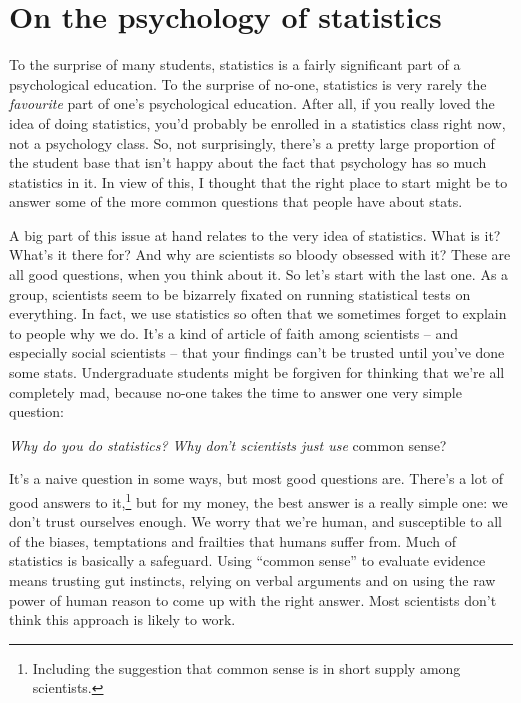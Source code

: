\documentclass[
  a4paper,
]{book}
\begin{document}
\hypertarget{on-the-psychology-of-statistics}{%
\section{On the psychology of
statistics}\label{on-the-psychology-of-statistics}}

To the surprise of many students, statistics is a fairly significant
part of a psychological education. To the surprise of no-one, statistics
is very rarely the \emph{favourite} part of one's psychological
education. After all, if you really loved the idea of doing statistics,
you'd probably be enrolled in a statistics class right now, not a
psychology class. So, not surprisingly, there's a pretty large
proportion of the student base that isn't happy about the fact that
psychology has so much statistics in it. In view of this, I thought that
the right place to start might be to answer some of the more common
questions that people have about stats.

A big part of this issue at hand relates to the very idea of statistics.
What is it? What's it there for? And why are scientists so bloody
obsessed with it? These are all good questions, when you think about it.
So let's start with the last one. As a group, scientists seem to be
bizarrely fixated on running statistical tests on everything. In fact,
we use statistics so often that we sometimes forget to explain to people
why we do. It's a kind of article of faith among scientists -- and
especially social scientists -- that your findings can't be trusted
until you've done some stats. Undergraduate students might be forgiven
for thinking that we're all completely mad, because no-one takes the
time to answer one very simple question:

\emph{Why do you do statistics? Why don't scientists just use} common
sense?

It's a naive question in some ways, but most good questions are. There's
a lot of good answers to it,\footnote{Including the suggestion that
  common sense is in short supply among scientists.} but for my money,
the best answer is a really simple one: we don't trust ourselves enough.
We worry that we're human, and susceptible to all of the biases,
temptations and frailties that humans suffer from. Much of statistics is
basically a safeguard. Using ``common sense'' to evaluate evidence means
trusting gut instincts, relying on verbal arguments and on using the raw
power of human reason to come up with the right answer. Most scientists
don't think this approach is likely to work.
\end{document}
